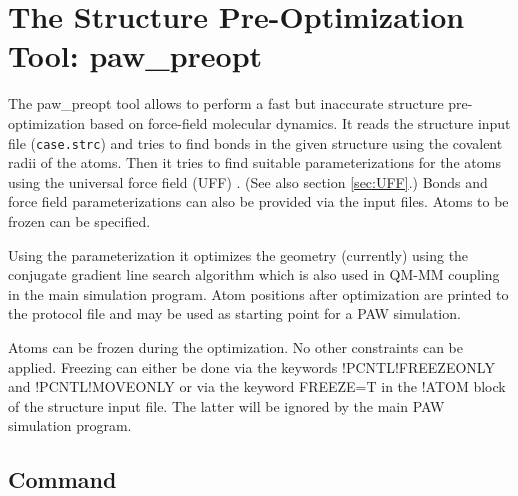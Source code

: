 \documentclass[final,12pt]{article}
\begin{document}
{{{{{{ 
 
 
 
 
 
 
 
 
 
 
 
 
 
 
 
 
 
 
 
 
 
 
 
 

\newpage
\section{The Structure Pre-Optimization Tool: paw\_preopt}

The paw\_preopt tool allows to perform a fast but inaccurate structure
pre-optimization based on force-field molecular dynamics. It reads the
structure input file (\verb'case.strc') and tries to find bonds in the given
structure using the covalent radii of the atoms. Then it tries to find
suitable parameterizations for the atoms using the universal force field (UFF)
\cite{rappe92_jacs114_10024}. (See also section \ref{sec:UFF}.) Bonds and
force field parameterizations can also be provided via the input files. Atoms
to be frozen can be specified.

Using the parameterization it optimizes the geometry (currently) using
the conjugate gradient line search algorithm which is also used in
QM-MM coupling in the main simulation program. Atom positions after
optimization are printed to the protocol file and may be used as
starting point for a PAW simulation.

Atoms can be frozen during the optimization. No other constraints can
be applied. Freezing can either be done via the keywords
!PCNTL!FREEZEONLY and !PCNTL!MOVEONLY or via the keyword FREEZE=T in
the !ATOM block of the structure input file. The latter will be
ignored by the main PAW simulation program.

\subsection{Command}

}}}}}}
\end{document}
